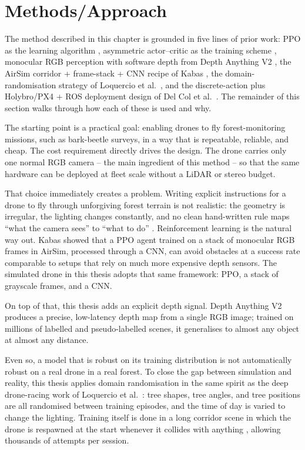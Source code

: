 \documentclass[../main.tex]{subfiles}
\begin{document}
\section{Methods/Approach}
\justify

The method described in this chapter is grounded in five lines of prior work: PPO as the learning algorithm \cite{Schulman2017}, asymmetric actor--critic as the training scheme \cite{Pinto2017}, monocular RGB perception with software depth from Depth Anything V2 \cite{Yang2024DepthAnythingV2}, the AirSim corridor + frame-stack + CNN recipe of Kabas \cite{Kabas2022}, the domain-randomisation strategy of Loquercio et al.\ \cite{Loquercio2019}, and the discrete-action plus Holybro/PX4 + ROS deployment design of Del Col et al.\ \cite{DelCol2025}. The remainder of this section walks through how each of these is used and why.

The starting point is a practical goal: enabling drones to fly forest-monitoring missions, such as bark-beetle surveys, in a way that is repeatable, reliable, and cheap. The cost requirement directly drives the design. The drone carries only one normal RGB camera -- the main ingredient of this method -- so that the same hardware can be deployed at fleet scale without a LiDAR or stereo budget.

That choice immediately creates a problem. Writing explicit instructions for a drone to fly through unforgiving forest terrain is not realistic: the geometry is irregular, the lighting changes constantly, and no clean hand-written rule maps ``what the camera sees'' to ``what to do'' \cite{Kabas2022}. Reinforcement learning is the natural way out. Kabas \cite{Kabas2022} showed that a PPO agent trained on a stack of monocular RGB frames in AirSim, processed through a CNN, can avoid obstacles at a success rate comparable to setups that rely on much more expensive depth sensors. The simulated drone in this thesis adopts that same framework: PPO, a stack of grayscale frames, and a CNN.

On top of that, this thesis adds an explicit depth signal. Depth Anything V2 \cite{Yang2024DepthAnythingV2} produces a precise, low-latency depth map from a single RGB image; trained on millions of labelled and pseudo-labelled scenes, it generalises to almost any object at almost any distance.

Even so, a model that is robust on its training distribution is not automatically robust on a real drone in a real forest. To close the gap between simulation and reality, this thesis applies domain randomisation in the same spirit as the deep drone-racing work of Loquercio et al.\ \cite{Loquercio2019}: tree shapes, tree angles, and tree positions are all randomised between training episodes, and the time of day is varied to change the lighting. Training itself is done in a long corridor scene in which the drone is respawned at the start whenever it collides with anything \cite{Kabas2022,Loquercio2019}, allowing thousands of attempts per session.
\end{document}
